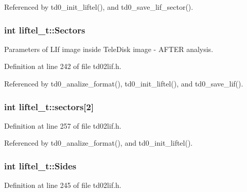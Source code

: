 Referenced by td0\+\_\+init\+\_\+liftel(), and td0\+\_\+save\+\_\+lif\+\_\+sector().

\subsubsection[{\texorpdfstring{Sectors}{Sectors}}]{\setlength{\rightskip}{0pt plus 5cm}int liftel\+\_\+t\+::\+Sectors}\hypertarget{structliftel__t_aa20cc45cd196c86b7d6176914226eacf}{}\label{structliftel__t_aa20cc45cd196c86b7d6176914226eacf}


Parameters of L\+If image inside Tele\+Disk image -\/ A\+F\+T\+ER analysis. 



Definition at line 242 of file td02lif.\+h.



Referenced by td0\+\_\+analize\+\_\+format(), td0\+\_\+init\+\_\+liftel(), and td0\+\_\+save\+\_\+lif().

\subsubsection[{\texorpdfstring{sectors}{sectors}}]{\setlength{\rightskip}{0pt plus 5cm}int liftel\+\_\+t\+::sectors\mbox{[}2\mbox{]}}\hypertarget{structliftel__t_a04c852b0fdc7a7c04d558d9a201f3f0d}{}\label{structliftel__t_a04c852b0fdc7a7c04d558d9a201f3f0d}


Definition at line 257 of file td02lif.\+h.



Referenced by td0\+\_\+analize\+\_\+format(), and td0\+\_\+init\+\_\+liftel().

\subsubsection[{\texorpdfstring{Sides}{Sides}}]{\setlength{\rightskip}{0pt plus 5cm}int liftel\+\_\+t\+::\+Sides}\hypertarget{structliftel__t_a1fafd0f113738152a2ae6251c2f528f7}{}\label{structliftel__t_a1fafd0f113738152a2ae6251c2f528f7}


Definition at line 245 of file td02lif.\+h.



